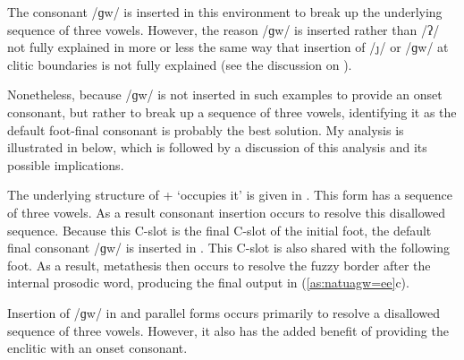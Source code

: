 \begin{exe}
\end{exe}

The consonant /ɡw/ is inserted in this environment
to break up the underlying sequence of three vowels.
However, the reason /ɡw/ is inserted rather than /ʔ/
not fully explained in more or less the same
way that insertion of /\j/ or /ɡw/ at clitic boundaries
is not fully explained (see the discussion on ).

Nonetheless, because /ɡw/ is not inserted in such
examples to provide an onset consonant, but rather
to break up a sequence of three vowels,
identifying it as the default foot-final consonant is probably the best solution.
My analysis is illustrated in 
below, which is followed by a discussion of this
analysis and its possible implications.

The underlying structure of  + 
{\ra}  `occupies it' is given in  .
This form has a sequence of three vowels.
As a result consonant insertion occurs to resolve this disallowed sequence.
Because this C-slot is the final C-slot of the initial foot,
the default final consonant /ɡw/ is inserted in .
This C-slot is also shared with the following foot.
As a result, metathesis then occurs to resolve the fuzzy border after
the internal prosodic word, producing the final output in (\ref{as:natuagw=ee}c).

Insertion of /ɡw/ in  and parallel forms occurs primarily
to resolve a disallowed sequence of three vowels.
However, it also has the added benefit of
providing the enclitic with an onset consonant.

